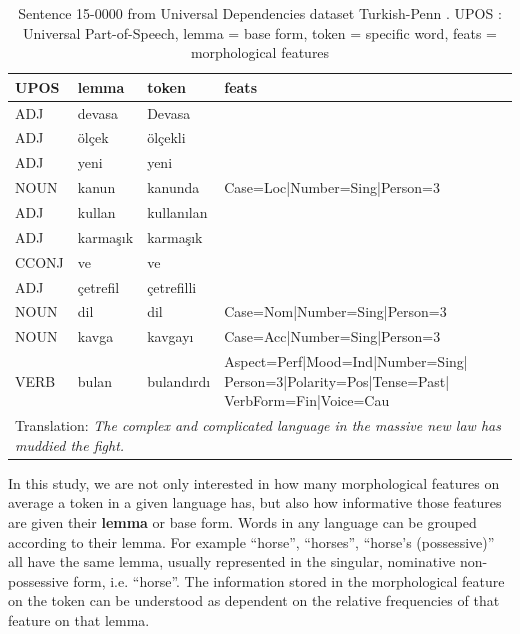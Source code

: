 \documentclass[USenglish]{article}
\begin{document}
\begin{table}[h]
    \centering
    \caption{Sentence 15-0000 from Universal Dependencies dataset Turkish-Penn \citep{kuzgun_2020_UD_turkish_penn}. UPOS : Universal Part-of-Speech, lemma = base form, token = specific word, feats = morphological features} %
    \label{tab:turkish_example}   
    \begin{tabular}{p{1.5cm}p{2cm}p{2cm}p{5cm}}
\toprule
	\textbf{UPOS}	&	\textbf{lemma}	&	\textbf{token}	&	\textbf{feats}	\\
    \midrule
	ADJ	&	devasa	&	Devasa	&	\\    \midrule
	ADJ	&	ölçek	&	ölçekli	&\\    \midrule
ADJ	&	yeni	&	yeni	&		\\    \midrule
	NOUN	&	kanun	&	kanunda	&	Case=Loc|Number=Sing|Person=3	\\    \midrule
	ADJ	&	kullan	&	kullanılan	&		\\    \midrule
ADJ	&	karmaşık	&	karmaşık	&\\    \midrule
CCONJ	&	ve	&	ve	&		\\    \midrule
ADJ	&	çetrefil	&	çetrefilli	&		\\    \midrule
	NOUN	&	dil	&	dil	&	Case=Nom|Number=Sing|Person=3	\\    \midrule
	NOUN	&	kavga	&	kavgayı	&	Case=Acc|Number=Sing|Person=3	\\    \midrule
	VERB	&	bulan	&	bulandırdı	&	Aspect=Perf|Mood=Ind|Number=Sing| Person=3|Polarity=Pos|Tense=Past| VerbForm=Fin|Voice=Cau	\\\midrule
   \multicolumn{4}{p{11cm}}{Translation: \textit{The complex and complicated language in the massive new law has muddied the fight.}}\\    \bottomrule
    \end{tabular}
\end{table}

In this study, we are not only interested in how many morphological features on average a token in a given language has, but also how informative those features are given their \textbf{lemma} or base form. 
Words in any language can be grouped according to their lemma. 
For example ``horse'', ``horses'', ``horse's (possessive)'' all have the same lemma, usually represented in the singular, nominative non-possessive form, i.e. ``horse''.
The information stored in the morphological feature on the token can be understood as dependent on the relative frequencies of that feature on that lemma. 
\end{document}
